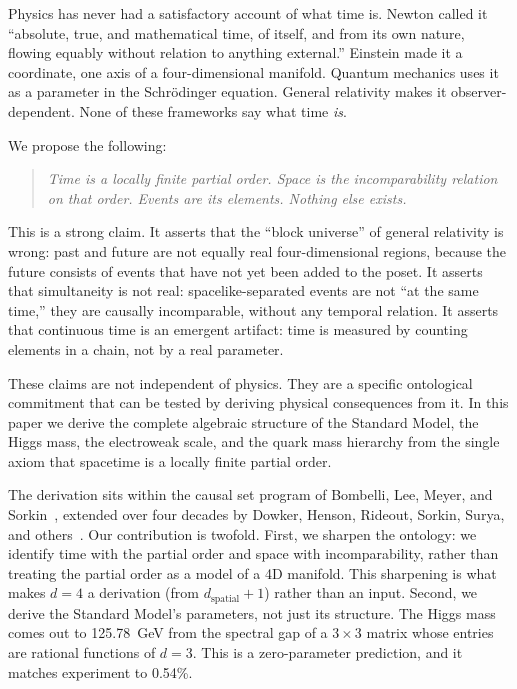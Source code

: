 \documentclass[11pt,letterpaper]{article}
\theoremstyle{remark}
\begin{document}
Physics has never had a satisfactory account of what time is. Newton
called it ``absolute, true, and mathematical time, of itself, and
from its own nature, flowing equably without relation to anything
external.'' Einstein made it a coordinate, one axis of a
four-dimensional manifold. Quantum mechanics uses it as a parameter
in the Schr\"odinger equation. General relativity makes it
observer-dependent. None of these frameworks say what time \emph{is}.

We propose the following:

\begin{quote}
\emph{Time is a locally finite partial order. Space is the
incomparability relation on that order. Events are its elements.
Nothing else exists.}
\end{quote}

\noindent This is a strong claim. It asserts that the ``block
universe'' of general relativity is wrong: past and future are not
equally real four-dimensional regions, because the future consists of
events that have not yet been added to the poset. It asserts that
simultaneity is not real: spacelike-separated events are not ``at the
same time,'' they are causally incomparable, without any temporal
relation. It asserts that continuous time is an emergent artifact:
time is measured by counting elements in a chain, not by a real
parameter.

These claims are not independent of physics. They are a specific
ontological commitment that can be tested by deriving physical
consequences from it. In this paper we derive the complete algebraic
structure of the Standard Model, the Higgs mass, the electroweak
scale, and the quark mass hierarchy from the single axiom that
spacetime is a locally finite partial order.

The derivation sits within the causal set program of Bombelli, Lee,
Meyer, and Sorkin~\cite{BLMS}, extended over four decades by Dowker,
Henson, Rideout, Sorkin, Surya, and
others~\cite{Sorkin2003,Dowker2013,Surya2019}. Our contribution is
twofold. First, we sharpen the ontology: we identify time with the
partial order and space with incomparability, rather than treating
the partial order as a model of a 4D manifold. This sharpening is
what makes $d = 4$ a derivation (from $d_{\mathrm{spatial}} + 1$)
rather than an input. Second, we derive the Standard Model's
parameters, not just its structure. The Higgs mass comes out to
125.78~GeV from the spectral gap of a $3 \times 3$ matrix whose
entries are rational functions of $d = 3$. This is a zero-parameter
prediction, and it matches experiment to 0.54\%.
\end{document}

